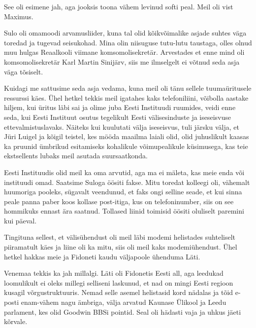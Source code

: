 
See oli esimene jah, aga jooksis toona vähem 
levinud softi peal. Meil oli vist Maximus. 

Sulo oli omamoodi arvamusliider, kuna tal olid 
kõikvõimalike asjade suhtes väga toredad ja tugevad seisukohad. 
Mina olin niisuguse tutu-lutu taustaga, olles olnud muu hulgas 
Reaalkooli viimane komsomolisekretär.
Arvestades et enne mind oli komsomolisekretär Karl Martin 
Sinijärv, siis me ilmselgelt ei võtnud seda 
asja väga tõsiselt.

Kuidagi me sattusime seda asja vedama, kuna meil oli tänu sellele 
tuumaüritusele ressurssi käes. Ühel hetkel tekkis meil igatahes kaks 
telefoniliini, võibolla aastake hiljem, kui üritus läbi sai ja 
olime juba Eesti Instituudi ruumides, veidi enne 
seda, kui Eesti Instituut osutus tegelikult Eesti välisesinduste ja iseseisvuse 
ettevalmistuslavaks. Näiteks kui kuulutati välja iseseisvus, 
tuli järsku välja, et Jüri Luigel ja kõigil teistel, kes 
mööda maailma laiali olid, olid juhuslikult kaasas ka pruunid ümbrikud 
esitamiseks kohalikule võimupealikule küsimusega, kas teie ekstsellents 
lubaks meil asutada suursaatkonda. 

Eesti Instituudis olid meil ka oma arvutid, aga ma ei mäleta, kas meie enda või instituudi omad. Saatsime Suloga öösiti 
fakse. Mitu toredat kolleegi 
oli, vähemalt huumoriga pooleks, sügavalt veendunud, et faks ongi selline seade, et kui sinna 
peale panna paber koos kollase post-itiga, kus on telefoninumber, siis on see 
hommikuks ennast ära saatnud. Tollased liinid toimisid öösiti oluliselt paremini kui päeval. 

Tingituna sellest, et välisühendust oli meil läbi modemi helistades 
suhteliselt piiramatult käes ja liine oli ka mitu, siis oli meil kaks 
modemiühendust. Ühel hetkel hakkas meie ja Fidoneti kaudu väljapoole 
ühenduma Läti.


Venemaa tekkis ka jah millalgi. Läti oli Fidonetis Eesti all, aga leedukad loomulikult ei oleks millegi 
selliseni laskunud, et nad on mingi Eesti regioon kusagil 
võrgustruktuuris. Nemad selle asemel helistasid kord nädalas ja tõid e-posti enam-vähem 
nagu ämbriga, välja arvatud Kaunase 
Ülikool ja Leedu parlament, kes olid 
Goodwin BBSi pointid. Seal oli hädasti vaja ja uhkus jäeti kõrvale. 

